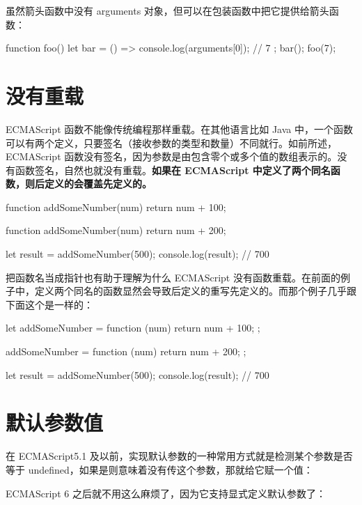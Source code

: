 虽然箭头函数中没有 arguments 对象，但可以在包装函数中把它提供给箭头函数：
\begin{js}
function foo() {
  let bar = () => {
    console.log(arguments[0]); // 7
  };
  bar();
}
foo(7);
\end{js}

\section{没有重载}
ECMAScript 函数不能像传统编程那样重载。在其他语言比如 Java 中，一个函数可以有两个定义，只要签名（接收参数的类型和数量）不同就行。如前所述，ECMAScript 函数没有签名，因为参数是由包含零个或多个值的数组表示的。没有函数签名，自然也就没有重载。\textbf{如果在 ECMAScript 中定义了两个同名函数，则后定义的会覆盖先定义的。}
\begin{js}
function addSomeNumber(num) {
  return num + 100;
}

function addSomeNumber(num) {
  return num + 200;
}

let result = addSomeNumber(500);
console.log(result); // 700
\end{js}

把函数名当成指针也有助于理解为什么 ECMAScript 没有函数重载。在前面的例子中，定义两个同名的函数显然会导致后定义的重写先定义的。而那个例子几乎跟下面这个是一样的：
\begin{js}
let addSomeNumber = function (num) {
  return num + 100;
};

addSomeNumber = function (num) {
  return num + 200;
};

let result = addSomeNumber(500);
console.log(result); // 700
\end{js}

\section{默认参数值}
在 ECMAScript5.1 及以前，实现默认参数的一种常用方式就是检测某个参数是否等于 undefined，如果是则意味着没有传这个参数，那就给它赋一个值：
ECMAScript 6 之后就不用这么麻烦了，因为它支持显式定义默认参数了：

